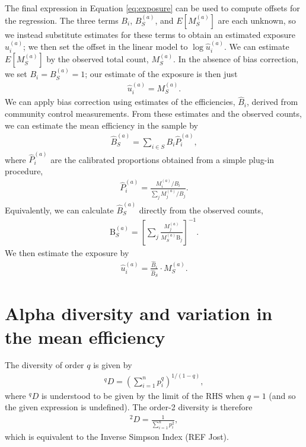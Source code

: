 \documentclass[
]{article}
\begin{document}
The final expression in Equation \eqref{eq:exposure} can be used to compute offsets for the regression.
The three terms \(B_i\), \(B_S^{(a)}\), and \(E[M_S^{(a)}]\) are each unknown, so we instead substitute estimates for these terms to obtain an estimated exposure \(\hat u_{i}^{(a)}\); we then set the offset in the linear model to \(\log \hat u_{i}^{(a)}\).
We can estimate \(E[M_S^{(a)}]\) by the observed total count, \(M_S^{(a)}\).
In the absence of bias correction, we set \(B_{i} = B_{S}^{(a)} = 1\); our estimate of the exposure is then just
\begin{align}
  \hat u_i^{(a)} = M_S^{(a)}.
\end{align}
We can apply bias correction using estimates of the efficiencies, \(\hat B_{i}\), derived from community control measurements.
From these estimates and the observed counts, we can estimate the mean efficiency in the sample by
\begin{align}
  \hat B_S^{(a)} = \sum_{i\in S} B_i \hat P_i^{(a)},
\end{align}
where \(\hat P_i^{(a)}\) are the calibrated proportions obtained from a simple plug-in procedure,
\begin{align}
  \hat P_i^{(a)} = \frac{M_i^{(a)} / B_i}{\sum_j M_j^{(a)} / B_j}.
\end{align}
Equivalently, we can calculate \(\hat B_S^{(a)}\) directly from the observed counts,
\begin{align}
  \text{B}_S^{(a)} =
  \left[\sum_j \frac{M_j^{(a)}}{M_S^{(a)} \text{B}_j}\right]^{-1}.
\end{align}
We then estimate the exposure by
\begin{align}
  \hat u_i^{(a)} = \frac{\hat B_i}{\hat B_S} \cdot M_S^{(a)}.
\end{align}

\hypertarget{diversity-and-mean-efficiency}{%
\section{Alpha diversity and variation in the mean efficiency}\label{diversity-and-mean-efficiency}}

The diversity of order \(q\) is given by
\begin{align}
  ^qD = \left(\sum_{i=1}^n p_i^q\right)^{1 /(1-q)},
\end{align}
where \(^qD\) is understood to be given by the limit of the RHS when \(q = 1\) (and so the given expression is undefined).
The order-2 diversity is therefore
\begin{align}
  ^2D = \frac{1}{\sum_{i=1}^n {p_i^2}},
\end{align}
which is equivalent to the Inverse Simpson Index (REF Jost).
\end{document}
